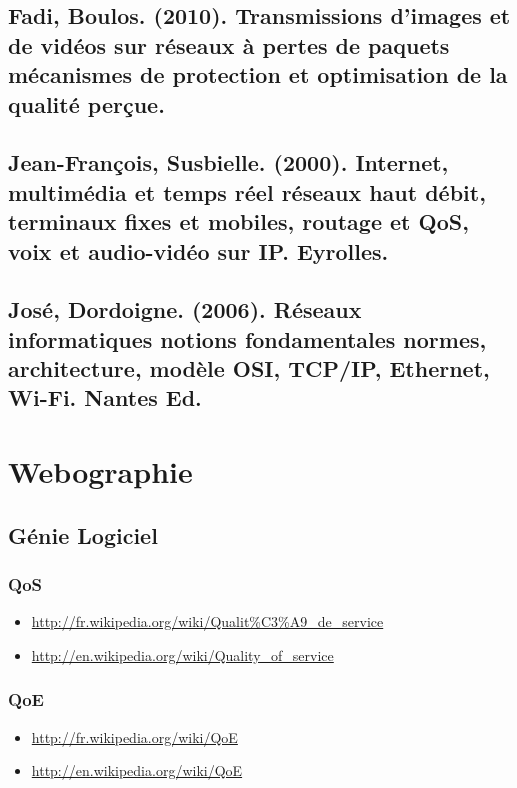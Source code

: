 \documentclass[french]{article}
\begin{document}
\subsection*{Fadi, Boulos. (2010). Transmissions d'images et de vidéos sur réseaux à pertes de paquets mécanismes de protection et optimisation de la qualité perçue.}

\subsection*{Jean-François, Susbielle. (2000). Internet, multimédia et temps réel réseaux haut débit, terminaux fixes et mobiles, routage et QoS, voix et audio-vidéo sur IP. Eyrolles.}

\subsection*{José, Dordoigne. (2006). Réseaux informatiques notions fondamentales normes, architecture, modèle OSI, TCP/IP, Ethernet, Wi-Fi. Nantes Ed.}

\newpage

\section{Webographie}

\subsection{Génie Logiciel}

\subsubsection*{QoS}
\begin{itemize}
	\item \url{http://fr.wikipedia.org/wiki/Qualit%C3%A9_de_service}
	\item \url{http://en.wikipedia.org/wiki/Quality_of_service}
\end{itemize}

\subsubsection*{QoE}
\begin{itemize}
\item \url{http://fr.wikipedia.org/wiki/QoE}
\item \url{http://en.wikipedia.org/wiki/QoE}
\end{itemize}
\end{document}
